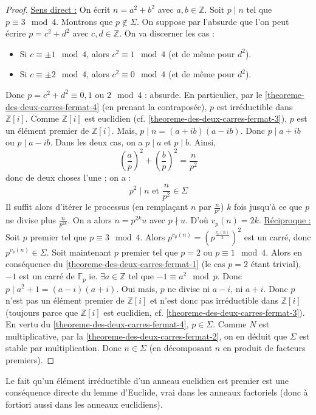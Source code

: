 	\begin{proof}
		\uline{Sens direct :} On écrit $n = a^2 + b^2$ avec $a, b \in \mathbb{Z}$. Soit $p \mid n$ tel que $p \equiv 3 \mod 4$. Montrons que $p \notin \Sigma$. On suppose par l'absurde que l'on peut écrire $p = c^2 + d^2$ avec $c, d \in \mathbb{Z}$. On va discerner les cas :
		\begin{itemize}
			\item Si $c \equiv \pm 1 \mod 4$, alors $c^2 \equiv 1 \mod 4$ (et de même pour $d^2$).
			\item Si $c \equiv \pm 2 \mod 4$, alors $c^2 \equiv 0 \mod 4$ (et de même pour $d^2$).
		\end{itemize}
		Donc $p = c^2 + d^2 \equiv 0, 1 \text{ ou } 2 \mod 4$ : absurde. En particulier, par le \cref{theoreme-des-deux-carres-fermat-4} (en prenant la contraposée), $p$ est irréductible dans $\mathbb{Z}[i]$. Comme $\mathbb{Z}[i]$ est euclidien (cf. \cref{theoreme-des-deux-carres-fermat-3}), $p$ est un élément premier de $\mathbb{Z}[i]$. Mais, $p \mid n = (a+ib)(a-ib)$. Donc $p \mid a+ib$ ou $p \mid a-ib$.
		Dans les deux cas, on a $p \mid a$ et $p \mid b$. Ainsi,
		\[ \left( \frac{a}{p} \right)^2 + \left( \frac{b}{p} \right)^2 = \frac{n}{p^2} \]
		donc de deux choses l'une ; on a :
		\[ p^2 \mid n \text{ et } \frac{n}{p^2} \in \Sigma \]
		Il suffit alors d'itérer le processus (en remplaçant $n$ par $\frac{n}{p^2}$) $k$ fois jusqu'à ce que $p$ ne divise plus $\frac{n}{p^{2k}}$. On a alors $n = p^{2k} u$ avec $p \nmid u$. D'où $v_p(n) = 2k$.
		\newpar
		\uline{Réciproque :} Soit $p$ premier tel que $p \equiv 3 \mod 4$. Alors $p^{v_p(n)} = \left( p^{\frac{v_p(n)}{2}} \right)^2$ est un carré, donc $p^{v_p(n)} \in \Sigma$.
		\newpar
		Soit maintenant $p$ premier tel que $p = 2$ ou $p \equiv 1  \mod 4$. Alors en conséquence du \cref{theoreme-des-deux-carres-fermat-1} (le cas $p = 2$ étant trivial), $-1$ est un carré de $\mathbb{F}_p$ ie. $\exists a \in \mathbb{Z}$ tel que $-1 \equiv a^2 \mod p$. Donc $p \mid a^2 + 1 = (a-i)(a+i)$. Oui mais, $p$ ne divise ni $a-i$, ni $a+i$. Donc $p$ n'est pas un élément premier de $\mathbb{Z}[i]$ et n'est donc pas irréductible dans $\mathbb{Z}[i]$ (toujours parce que $\mathbb{Z}[i]$ est euclidien, cf. \cref{theoreme-des-deux-carres-fermat-3}). En vertu du \cref{theoreme-des-deux-carres-fermat-4}, $p \in \Sigma$.
		\newpar
		Comme $N$ est multiplicative, par la \cref{theoreme-des-deux-carres-fermat-2}, on en déduit que $\Sigma$ est stable par multiplication. Donc $n \in \Sigma$ (en décomposant $n$ en produit de facteurs premiers).
	\end{proof}


	\begin{remark}
		Le fait qu'un élément irréductible d'un anneau euclidien est premier est une conséquence directe du lemme d'Euclide, vrai dans les anneaux factoriels (donc à fortiori aussi dans les anneaux euclidiens).
	\end{remark}

